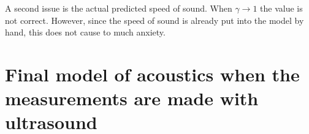 A second issue is the actual predicted speed of sound.
When $\gamma \rightarrow 1$ the value is not correct.
However, since the speed of sound is
already put into the model by hand,
this does not cause to much anxiety.












\section{Final model of acoustics when the measurements are made with ultrasound}\label{sec:Maxwell}

